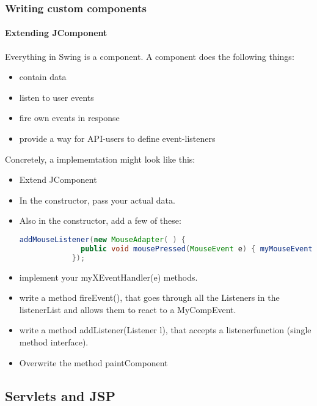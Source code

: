  
 
 
 \subsubsection{Writing custom components}
 
 \paragraph{Extending JComponent} Everything in Swing is a component. A component does the following things: 
 \begin{itemize}
    \item contain data
    \item listen to user events
    \item fire own events in response
    \item provide a way for API-users to define event-listeners
 \end{itemize}
 Concretely, a implememtation might look like this: 
 
 \begin{itemize}
    \item Extend JComponent
    \item In the constructor, pass your actual data.
    \item Also in the constructor, add a few of these: 
        \begin{lstlisting}[language=java]
            addMouseListener(new MouseAdapter( ) {
              public void mousePressed(MouseEvent e) { myMouseEventHandler(e); }
            });
        \end{lstlisting}
    \item implement your myXEventHandler(e) methods.
    \item write a method fireEvent(), that goes through all the Listeners in the listenerList and allows them to react to a MyCompEvent. 
    \item write a method addListener(Listener l), that accepts a listenerfunction (single method interface).
    \item Overwrite the method paintComponent
 \end{itemize}
 
 



\subsection{Servlets and JSP}


